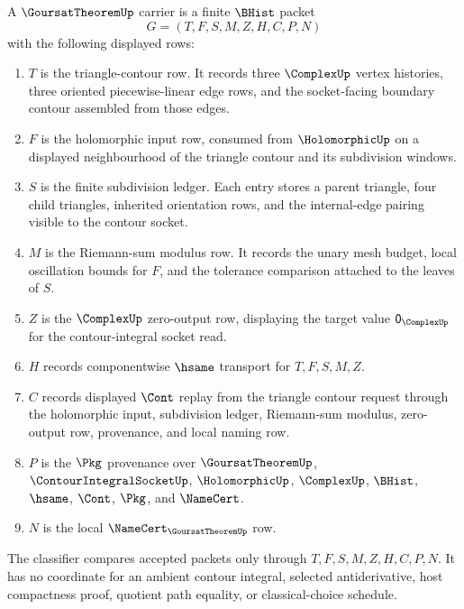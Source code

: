 \begin{definition}
\label{def:goursat-theorem-carrier}
A $\GoursatTheoremUp$ carrier is a finite $\BHist$ packet
$$
G=(T,F,S,M,Z,H,C,P,N)
$$
with the following displayed rows:
\begin{enumerate}
\item $T$ is the triangle-contour row. It records three $\ComplexUp$ vertex histories, three oriented piecewise-linear edge rows, and the socket-facing boundary contour assembled from those edges.
\item $F$ is the holomorphic input row, consumed from $\HolomorphicUp$ on a displayed neighbourhood of the triangle contour and its subdivision windows.
\item $S$ is the finite subdivision ledger. Each entry stores a parent triangle, four child triangles, inherited orientation rows, and the internal-edge pairing visible to the contour socket.
\item $M$ is the Riemann-sum modulus row. It records the unary mesh budget, local oscillation bounds for $F$, and the tolerance comparison attached to the leaves of $S$.
\item $Z$ is the $\ComplexUp$ zero-output row, displaying the target value $\mathsf{0}_{\ComplexUp}$ for the contour-integral socket read.
\item $H$ records componentwise $\hsame$ transport for $T,F,S,M,Z$.
\item $C$ records displayed $\Cont$ replay from the triangle contour request through the holomorphic input, subdivision ledger, Riemann-sum modulus, zero-output row, provenance, and local naming row.
\item $P$ is the $\Pkg$ provenance over $\GoursatTheoremUp$, $\ContourIntegralSocketUp$, $\HolomorphicUp$, $\ComplexUp$, $\BHist$, $\hsame$, $\Cont$, $\Pkg$, and $\NameCert$.
\item $N$ is the local $\NameCert_{\GoursatTheoremUp}$ row.
\end{enumerate}
The classifier compares accepted packets only through $T,F,S,M,Z,H,C,P,N$. It has no coordinate for an ambient contour integral, selected antiderivative, host compactness proof, quotient path equality, or classical-choice schedule.
\end{definition}

